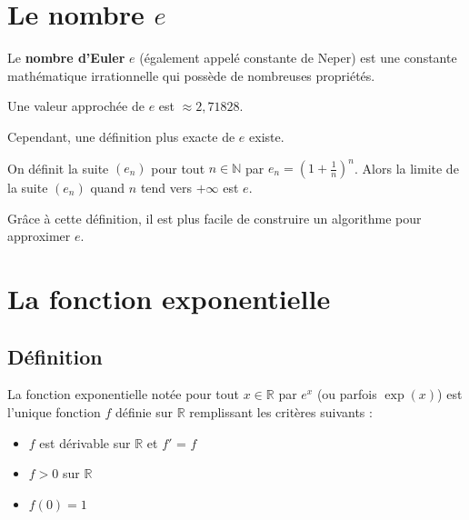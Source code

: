 


	
	\section{Le nombre \texorpdfstring{$e$}{e}}
	
	Le \textbf{nombre d'Euler} $e$ (également appelé constante de Neper) est une constante mathématique irrationnelle qui possède de nombreuses propriétés.
	
	\begin{formula}
		Une valeur approchée de $e$ est $\approx 2,71828$.
	\end{formula}
	
	\begin{nosummary}
		Cependant, une définition plus exacte de $e$ existe.
		
		\begin{formula}
			On définit la suite $(e_n)$ pour tout $n \in \mathbb{N}$ par $e_n = \left(1 + \frac{1}{n}\right)^n$.
			Alors la limite de la suite $(e_n)$ quand $n$ tend vers $+\infty$ est $e$.
		\end{formula}
		
		\begin{tip}
			Grâce à cette définition, il est plus facile de construire un algorithme pour approximer $e$.
		\end{tip}
	\end{nosummary}
	
	\section{La fonction exponentielle}
	
	\subsection{Définition}
	\label{definition}
	
	\begin{formula}[Définition]
		La fonction exponentielle notée pour tout $x \in \mathbb{R}$ par $e^x$ (ou parfois $\exp(x)$) est l'unique fonction $f$ définie sur $\mathbb{R}$ remplissant les critères suivants :
		\begin{itemize}
			\item $f$ est dérivable sur $\mathbb{R}$ et $f'$ = $f$
			\item $f > 0$ sur $\mathbb{R}$
			\item $f(0) = 1$
		\end{itemize}
	\end{formula}
	
